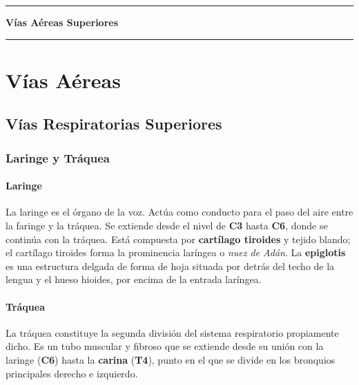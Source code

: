 \clearpage
\onecolumn
\thispagestyle{empty}
\vspace*{\fill}
\begin{center}
	{\color{radblue}\rule{\linewidth}{2pt}}\par
	\vspace{6mm}
	{\Huge\bfseries\color{radblue} Vías Aéreas Superiores}\par
	\vspace{6mm}
	{\color{radblue}\rule{\linewidth}{2pt}}
\end{center}
\vspace*{\fill}
\clearpage
\twocolumn
\pagestyle{contenido}



	
\clearpage	
		\onecolumn
		
		\section{Vías Aéreas}
		
		\subsection{Vías Respiratorias Superiores}
		
		\subsubsection*{Laringe y Tráquea}
		
		\paragraph{Laringe}
		La laringe es el órgano de la voz. Actúa como conducto para el paso del aire entre la faringe y la tráquea. Se extiende desde el nivel de \textbf{C3} hasta \textbf{C6}, donde se continúa con la tráquea. Está compuesta por \textbf{cartílago tiroides} y tejido blando; el cartílago tiroides forma la prominencia laríngea o \textit{nuez de Adán}. La \textbf{epiglotis} es una estructura delgada de forma de hoja situada por detrás del techo de la lengua y el hueso hioides, por encima de la entrada laríngea.
		
		\paragraph{Tráquea}
		La tráquea constituye la segunda división del sistema respiratorio propiamente dicho. Es un tubo muscular y fibroso que se extiende desde su unión con la laringe (\textbf{C6}) hasta la \textbf{carina} (\textbf{T4}), punto en el que se divide en los bronquios principales derecho e izquierdo.
		
